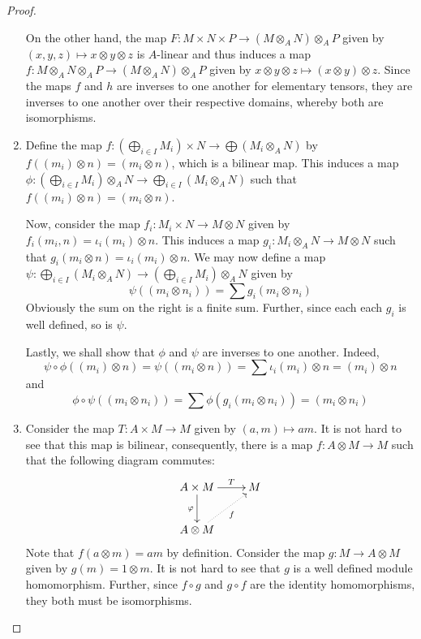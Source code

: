 \begin{proof}
\begin{enumerate}[label=(\alph*)]
On the other hand, the map $F: M\times N\times P\to (M\otimes_A N)\otimes_A P$ given by $(x,y,z)\mapsto x\otimes y\otimes z$ is $A$-linear and thus induces a map $f: M\otimes_A N\otimes_A P\to (M\otimes_A N)\otimes_A P$ given by $x\otimes y\otimes z\mapsto(x\otimes y)\otimes z$. Since the maps $f$ and $h$ are inverses to one another for elementary tensors, they are inverses to one another over their respective domains, whereby both are isomorphisms.

\item Define the map $f:\left(\bigoplus_{i\in I}M_i\right)\times N\to\bigoplus(M_i\otimes_A N)$ by $f((m_i)\otimes n) = (m_i\otimes n)$, which is a bilinear map. This induces a map $\phi:\left(\bigoplus_{i\in I}M_i\right)\otimes_A N\to\bigoplus_{i\in I}(M_i\otimes_A N)$ such that $f((m_i)\otimes n) = (m_i\otimes n)$. 

Now, consider the map $f_i: M_i\times N\to M\otimes N$ given by $f_i(m_i, n) = \iota_i(m_i)\otimes n$. This induces a map $g_i: M_i\otimes_A N\to M\otimes N$ such that $g_i(m_i\otimes n) = \iota_i(m_i)\otimes n$. We may now define a map $\psi:\bigoplus_{i\in I} (M_i\otimes_A N)\to\left(\bigoplus_{i\in I}M_i\right)\otimes_A N$ given by 
\begin{equation*}
    \psi((m_i\otimes n_i)) = \sum g_i(m_i\otimes n_i)
\end{equation*}
Obviously the sum on the right is a finite sum. Further, since each each $g_i$ is well defined, so is $\psi$. 

Lastly, we shall show that $\phi$ and $\psi$ are inverses to one another. Indeed, 
\begin{equation*}
    \psi\circ\phi((m_i)\otimes n) = \psi((m_i\otimes n)) = \sum \iota_i(m_i)\otimes n = (m_i)\otimes n
\end{equation*}
and 
\begin{equation*}
    \phi\circ\psi((m_i\otimes n_i)) = \sum\phi(g_i(m_i\otimes n_i)) = (m_i\otimes n_i)
\end{equation*}

\item Consider the map $T: A\times M\to M$ given by $(a,m)\mapsto am$. It is not hard to see that this map is bilinear, consequently, there is a map $f: A\otimes M\to M$ such that the following diagram commutes: 
\begin{equation*}
\xymatrix {
    A\times M\ar[r]^-T\ar[d]_\varphi & M\\
    A\otimes M\ar@{.>}[ru]_-{f}
}
\end{equation*}
Note that $f(a\otimes m) = am$ by definition. Consider the map $g: M\to A\otimes M$ given by $g(m) = 1\otimes m$. It is not hard to see that $g$ is a well defined module homomorphism. Further, since $f\circ g$ and $g\circ f$ are the identity homomorphisms, they both must be isomorphisms.
\end{enumerate}
\end{proof}

